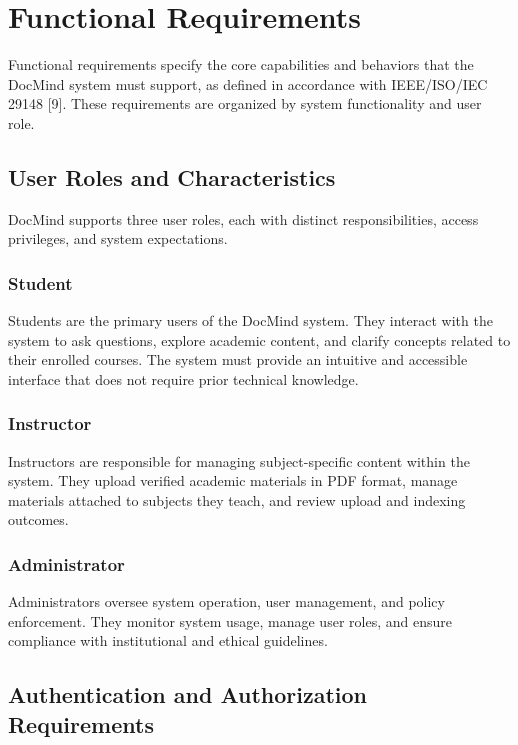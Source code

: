 \documentclass[12pt, a4paper, oneside]{report}
\let\oldsection\section
\renewcommand{\section}{%
  \addtocontents{toc}{\protect\needspace{4\baselineskip}}%
  \oldsection
}
\let\oldsubsection\subsection
\renewcommand{\subsection}{%
  \addtocontents{toc}{\protect\needspace{3\baselineskip}}%
  \oldsubsection
}
\begin{document}
\newpage

\section{Functional Requirements}

Functional requirements specify the core capabilities and behaviors that the DocMind system must support, as defined in accordance with IEEE/ISO/IEC 29148 [9]. These requirements are organized by system functionality and user role.

\subsection{User Roles and Characteristics}

DocMind supports three user roles, each with distinct responsibilities, access privileges, and system expectations.

\subsubsection{Student}

Students are the primary users of the DocMind system. They interact with the system to ask questions, explore academic content, and clarify concepts related to their enrolled courses. The system must provide an intuitive and accessible interface that does not require prior technical knowledge.

\subsubsection{Instructor}

Instructors are responsible for managing subject-specific content within the system. They upload verified academic materials in PDF format, manage materials attached to subjects they teach, and review upload and indexing outcomes.

\subsubsection{Administrator}

Administrators oversee system operation, user management, and policy enforcement. They monitor system usage, manage user roles, and ensure compliance with institutional and ethical guidelines.
\newpage
\subsection{Authentication and Authorization Requirements}
\end{document}
